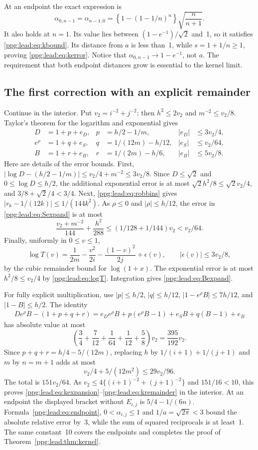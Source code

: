 \documentclass[11pt,letterpaper]{article}
\theoremstyle{remark}\newtheorem{remark}[theorem]{Remark}
\numberwithin{equation}{section}
\begin{document}
At an endpoint the exact expression is
\begin{equation}\label{ppg:lead:eq:endpoint}
 \alpha_{0,n-1}=\alpha_{n-1,0}
 =\left\{1-(1-1/n)^n\right\}\sqrt{\frac n{n+1}}.
\end{equation}
It also holds at $n=1$. Its value lies between $(1-e^{-1})/\sqrt2$ and~1, so it satisfies \eqref{ppg:lead:eq:kbound}. Its distance from $a$ is less than~1, while $s=1+1/n\ge1$, proving \eqref{ppg:lead:eq:kerror}. Notice that $\alpha_{0,n-1}\to1-e^{-1}$, not $a$. The requirement that both endpoint distances grow is essential to the kernel limit.

\subsection{The first correction with an explicit remainder}
Continue in the interior. Put $v_2=i^{-2}+j^{-2}$; then $h^2\le2v_2$ and $m^{-2}\le v_2/8$. Taylor's theorem for the logarithm and exponential gives
\begin{align}
 D&=1+p+e_D,& p&=h/2-1/m,& |e_D|&\le3v_2/4,\label{ppg:lead:eq:Dexpand}\\
 e^\rho&=1+q+e_S,& q&=1/(12m)-h/12,& |e_S|&\le v_2/64,\label{ppg:lead:eq:Sexpand}\\
 B&=1+r+e_B,& r&=1/(2m)-h/6,& |e_B|&\le5v_2/8.\label{ppg:lead:eq:Bexpand}
\end{align}
Here are details of the error bounds. First,
$|\log D-(h/2-1/m)|\le v_2/4+m^{-2}\le3v_2/8$.
Since $D\le\sqrt2$ and $0\le\log D\le h/2$, the additional exponential error is at most $\sqrt2 h^2/8\le\sqrt2 v_2/4$, and $3/8+\sqrt2/4<3/4$.
Next, \eqref{ppg:lead:eq:robbins} gives
$|r_k-1/(12k)|\le1/(144k^2)$. As $\rho\le0$ and $|\rho|\le h/12$, the error in \eqref{ppg:lead:eq:Sexpand} is at most
\[
 \frac{v_2+m^{-2}}{144}+\frac{h^2}{288}
 \le(1/128+1/144)v_2<v_2/64.
\]
Finally, uniformly in $0\le v\le1$,
\[
 \log T(v)=\frac1{2m}-\frac{v^2}{2i}-\frac{(1-v)^2}{2j}+\epsilon(v),
 \qquad |\epsilon(v)|\le3v_2/8,
\]
by the cubic remainder bound for $\log(1+x)$. The exponential error is at most $h^2/8\le v_2/4$ by \eqref{ppg:lead:eq:logT}. Integration gives \eqref{ppg:lead:eq:Bexpand}.

For fully explicit multiplication, use $|p|\le h/2$, $|q|\le h/12$,
$|1-e^\rho B|\le7h/12$, and $|1-B|\le h/2$. The identity
\begin{align*}
 De^\rho B-(1+p+q+r)
 =e_De^\rho B+p(e^\rho B-1)+e_SB+q(B-1)+e_B
\end{align*}
has absolute value at most
\[
 \left(\frac34+\frac7{12}+\frac1{64}+\frac1{12}+\frac58\right)v_2
 =\frac{395}{192}v_2.
\]
Since $p+q+r=h/4-5/(12m)$, replacing $h$ by
$1/(i+1)+1/(j+1)$ and $m$ by $n=m+1$ adds at most
\[
 v_2/4+5/(12m^2)\le29v_2/96.
\]
The total is $151v_2/64$. As
$v_2\le4\{(i+1)^{-2}+(j+1)^{-2}\}$ and $151/16<10$, this proves \eqref{ppg:lead:eq:kexpansion}--\eqref{ppg:lead:eq:kremainder} in the interior. At an endpoint the displayed bracket without $E_{i,j}$ is $5/4-1/(6n)$. Formula~\eqref{ppg:lead:eq:endpoint}, $0<\alpha_{i,j}\le1$ and $1/a=\sqrt{2\pi}<3$ bound the absolute relative error by~3, while the sum of squared reciprocals is at least~1. The same constant~10 covers the endpoints and completes the proof of Theorem~\ref{ppg:lead:thm:kernel}.
\end{document}
